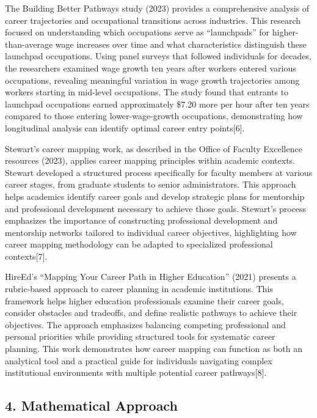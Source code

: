 \documentclass[
  letterpaper,
  DIV=11,
  numbers=noendperiod]{scrartcl}
\begin{document}
The Building Better Pathways study (2023) provides a comprehensive
analysis of career trajectories and occupational transitions across
industries. This research focused on understanding which occupations
serve as ``launchpads'' for higher-than-average wage increases over time
and what characteristics distinguish these launchpad occupations. Using
panel surveys that followed individuals for decades, the researchers
examined wage growth ten years after workers entered various
occupations, revealing meaningful variation in wage growth trajectories
among workers starting in mid-level occupations. The study found that
entrants to launchpad occupations earned approximately \$7.20 more per
hour after ten years compared to those entering lower-wage-growth
occupations, demonstrating how longitudinal analysis can identify
optimal career entry points{[}6{]}.

Stewart's career mapping work, as described in the Office of Faculty
Excellence resources (2023), applies career mapping principles within
academic contexts. Stewart developed a structured process specifically
for faculty members at various career stages, from graduate students to
senior administrators. This approach helps academics identify career
goals and develop strategic plans for mentorship and professional
development necessary to achieve those goals. Stewart's process
emphasizes the importance of constructing professional development and
mentorship networks tailored to individual career objectives,
highlighting how career mapping methodology can be adapted to
specialized professional contexts{[}7{]}.

HireEd's ``Mapping Your Career Path in Higher Education'' (2021)
presents a rubric-based approach to career planning in academic
institutions. This framework helps higher education professionals
examine their career goals, consider obstacles and tradeoffs, and define
realistic pathways to achieve their objectives. The approach emphasizes
balancing competing professional and personal priorities while providing
structured tools for systematic career planning. This work demonstrates
how career mapping can function as both an analytical tool and a
practical guide for individuals navigating complex institutional
environments with multiple potential career pathways{[}8{]}.

\subsection{4. Mathematical Approach}\label{mathematical-approach}
\end{document}
